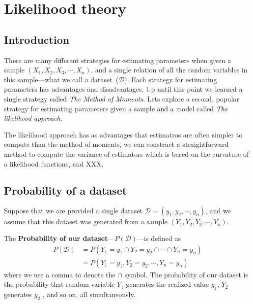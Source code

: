 \chapter{Likelihood theory}
\hspace{1mm}

\section{Introduction}\label{intro}

There are many different strategies for estimating parameters when given a sample $(X_{1},X_{2}, X_{3}, \cdots, X_{n})$, and a single relation of all the random variables in this sample---what we call a dataset~($\mathcal{D}$).
Each strategy for estimating parameters has advantages and disadvantages. 
Up until this point we learned a single strategy called \textit{The Method of Moments}.
Lets explore a second, popular strategy for estimating parameters given a sample and a model called \textit{The likelihood approach}.

The likelihood approach has as advantages that estimatros are often simpler to compute than the method of moments, we can construct a straightforward method to compute the variance of estimators which is based on the curvature of a likelihood functions, and XXX.

\section{Probability of a dataset}

Suppose that we are provided a single dataset $\mathcal{D} = (y_{1},y_{2},\cdots,y_{n})$, and we assume that this dataset was generated from a sample $(Y_{1},Y_{2},Y_{3},\cdots,Y_{n})$.

The \textbf{Probability of our dataset}---$P(\mathcal{D})$---is defined as 
\begin{align}
    P(\mathcal{D}) &= P( Y_{1}=y_{1} \cap Y_{2}=y_{2} \cap \cdots \cap Y_{n}=y_{n} )\\
                   &=P( Y_{1}=y_{1} , Y_{2}=y_{2} , \cdots , Y_{n}=y_{n} )
\end{align}
where we use a comma to denote the $\cap$ symbol.
The probability of our dataset is the probability that random variable $Y_{1}$ generates the realized value $y_{1}$, $Y_{2}$ generates $y_{2}$ , and so on, all simultaneously.

